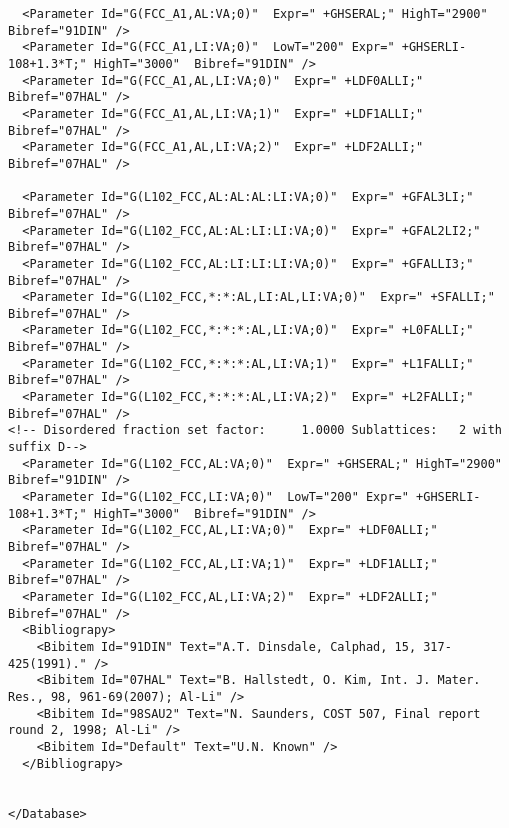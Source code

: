\documentclass{article}
\begin{document}
\begin{appendices}
\begin{verbatim}
  <Parameter Id="G(FCC_A1,AL:VA;0)"  Expr=" +GHSERAL;" HighT="2900"  Bibref="91DIN" />
  <Parameter Id="G(FCC_A1,LI:VA;0)"  LowT="200" Expr=" +GHSERLI-108+1.3*T;" HighT="3000"  Bibref="91DIN" />
  <Parameter Id="G(FCC_A1,AL,LI:VA;0)"  Expr=" +LDF0ALLI;"  Bibref="07HAL" />
  <Parameter Id="G(FCC_A1,AL,LI:VA;1)"  Expr=" +LDF1ALLI;"  Bibref="07HAL" />
  <Parameter Id="G(FCC_A1,AL,LI:VA;2)"  Expr=" +LDF2ALLI;"  Bibref="07HAL" />

  <Parameter Id="G(L102_FCC,AL:AL:AL:LI:VA;0)"  Expr=" +GFAL3LI;"  Bibref="07HAL" />
  <Parameter Id="G(L102_FCC,AL:AL:LI:LI:VA;0)"  Expr=" +GFAL2LI2;"  Bibref="07HAL" />
  <Parameter Id="G(L102_FCC,AL:LI:LI:LI:VA;0)"  Expr=" +GFALLI3;"  Bibref="07HAL" />
  <Parameter Id="G(L102_FCC,*:*:AL,LI:AL,LI:VA;0)"  Expr=" +SFALLI;"  Bibref="07HAL" />
  <Parameter Id="G(L102_FCC,*:*:*:AL,LI:VA;0)"  Expr=" +L0FALLI;"  Bibref="07HAL" />
  <Parameter Id="G(L102_FCC,*:*:*:AL,LI:VA;1)"  Expr=" +L1FALLI;"  Bibref="07HAL" />
  <Parameter Id="G(L102_FCC,*:*:*:AL,LI:VA;2)"  Expr=" +L2FALLI;"  Bibref="07HAL" />
<!-- Disordered fraction set factor:     1.0000 Sublattices:   2 with suffix D-->
  <Parameter Id="G(L102_FCC,AL:VA;0)"  Expr=" +GHSERAL;" HighT="2900"  Bibref="91DIN" />
  <Parameter Id="G(L102_FCC,LI:VA;0)"  LowT="200" Expr=" +GHSERLI-108+1.3*T;" HighT="3000"  Bibref="91DIN" />
  <Parameter Id="G(L102_FCC,AL,LI:VA;0)"  Expr=" +LDF0ALLI;"  Bibref="07HAL" />
  <Parameter Id="G(L102_FCC,AL,LI:VA;1)"  Expr=" +LDF1ALLI;"  Bibref="07HAL" />
  <Parameter Id="G(L102_FCC,AL,LI:VA;2)"  Expr=" +LDF2ALLI;"  Bibref="07HAL" />
  <Bibliograpy>
    <Bibitem Id="91DIN" Text="A.T. Dinsdale, Calphad, 15, 317-425(1991)." /> 
    <Bibitem Id="07HAL" Text="B. Hallstedt, O. Kim, Int. J. Mater. Res., 98, 961-69(2007); Al-Li" /> 
    <Bibitem Id="98SAU2" Text="N. Saunders, COST 507, Final report round 2, 1998; Al-Li" /> 
    <Bibitem Id="Default" Text="U.N. Known" /> 
  </Bibliograpy>


</Database>
\end{verbatim}

\end{appendices}
\end{document}
